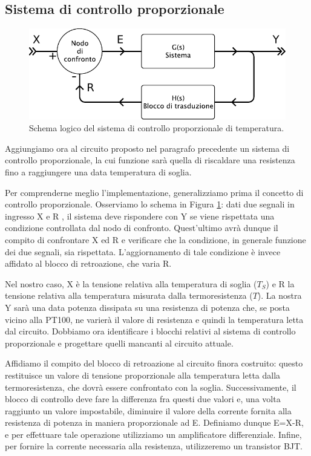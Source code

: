 \newpage
\vspace{-2mm}
\subsection{Sistema di controllo proporzionale}

\begin{figure}
\centering
\includegraphics[width=.5\textwidth]{../E06/latex/s2.pdf}
\caption{Schema logico del sistema di controllo proporzionale di temperatura.}
\label{fig6:scheme2}
\end{figure}

Aggiungiamo ora al circuito proposto nel paragrafo precedente un sistema di controllo proporzionale, la cui funzione sarà quella di riscaldare una resistenza fino a raggiungere una data temperatura di soglia.

Per comprenderne meglio l'implementazione, generalizziamo prima il concetto di controllo proporzionale.
Osserviamo lo schema in Figura \ref{fig6:scheme2}: dati due segnali in ingresso X e R , il sistema deve rispondere con Y  se viene rispettata una condizione controllata dal nodo di confronto.
Quest'ultimo avrà dunque il compito di confrontare X ed R e verificare che la condizione, in generale funzione dei due segnali, sia rispettata.
L'aggiornamento di tale condizione è invece affidato al blocco di retroazione, che varia R.

Nel nostro caso, X è la tensione relativa alla temperatura di soglia ($T_{S}$) e R la tensione relativa alla temperatura misurata dalla termoresistenza ($T$).
La nostra Y sarà una data potenza dissipata su una resistenza di potenza che, se posta vicino alla PT100, ne varierà il valore di resistenza e quindi la temperatura letta dal circuito.
Dobbiamo ora identificare i blocchi relativi al sistema di controllo proporzionale e progettare quelli mancanti al circuito attuale.

Affidiamo il compito del blocco di retroazione al circuito finora costruito: questo restituisce un valore di tensione proporzionale alla temperatura letta dalla termoresistenza, che dovrà essere confrontato con la soglia.
Successivamente, il blocco di controllo deve fare la differenza fra questi due valori e, una volta raggiunto un valore impostabile, diminuire il valore della corrente fornita alla resistenza di potenza in maniera proporzionale ad E.
Definiamo dunque E=X-R, e per effettuare tale operazione utilizziamo un amplificatore differenziale.
Infine, per fornire la corrente necessaria alla resistenza, utilizzeremo un transistor BJT.
\vspace{-2mm}
